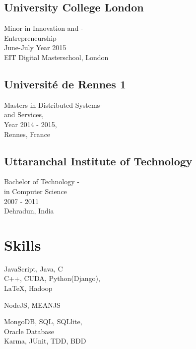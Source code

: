 \documentclass[]{hieudo-build}
\begin{document}
\begin{minipage}[t]{0.34\textwidth}
\subsection{University College London}
Minor in Innovation and -\\ Entrepreneurship \\
June-July Year 2015\\
EIT Digital Masterschool, London \\
\sectionsep

\subsection{Université de Rennes 1}
Masters in Distributed Systems- \\
and Services, \\
Year 2014 - 2015, \\
Rennes, France \\
\sectionsep

\subsection{Uttaranchal Institute of Technology}
Bachelor of Technology - \\
in Computer Science\\
2007 - 2011 \\
Dehradun, India \\
\sectionsep

\section{Skills}
JavaScript, Java, C\\ 

C++, CUDA, Python(Django),\\
LaTeX, Hadoop

NodeJS, MEANJS

MongoDB, SQL, SQLlite, \\ Oracle Database \\

Karma, JUnit, TDD, BDD


\end{minipage}
\end{document}
